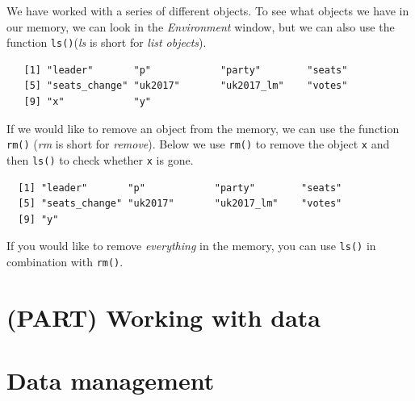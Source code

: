 \documentclass[12pt,oneside]{reedthesis}
\theoremstyle{definition}
\theoremstyle{definition}
\theoremstyle{definition}
\theoremstyle{remark}
\begin{document}
  We have worked with a series of different objects. To see what objects
  we have in our memory, we can look in the \emph{Environment} window, but
  we can also use the function \texttt{ls()}(\emph{ls} is short for
  \emph{list objects}).
  \begin{Shaded}
  \begin{Highlighting}[]
  \NormalTok{()}
  \end{Highlighting}
  \end{Shaded}
  \begin{verbatim}
   [1] "leader"       "p"            "party"        "seats"       
   [5] "seats_change" "uk2017"       "uk2017_lm"    "votes"       
   [9] "x"            "y"           
  \end{verbatim}
  If we would like to remove an object from the memory, we can use the
  function \texttt{rm()} (\emph{rm} is short for \emph{remove}). Below we
  use \texttt{rm()} to remove the object \texttt{x} and then \texttt{ls()}
  to check whether \texttt{x} is gone.
  \begin{Shaded}
  \begin{Highlighting}[]
  
  \NormalTok{()}
  \end{Highlighting}
  \end{Shaded}
  \begin{verbatim}
  [1] "leader"       "p"            "party"        "seats"       
  [5] "seats_change" "uk2017"       "uk2017_lm"    "votes"       
  [9] "y"           
  \end{verbatim}
  If you would like to remove \emph{everything} in the memory, you can use
  \texttt{ls()} in combination with \texttt{rm()}.
  \begin{Shaded}
  \begin{Highlighting}[]
  \NormalTok{(} \NormalTok{())}
  
  \NormalTok{()}
  \end{Highlighting}
  \end{Shaded}
  \chapter*{(PART) Working with data}\label{part-working-with-data}
  
  \chapter{Data management}\label{data}
  
\end{document}
